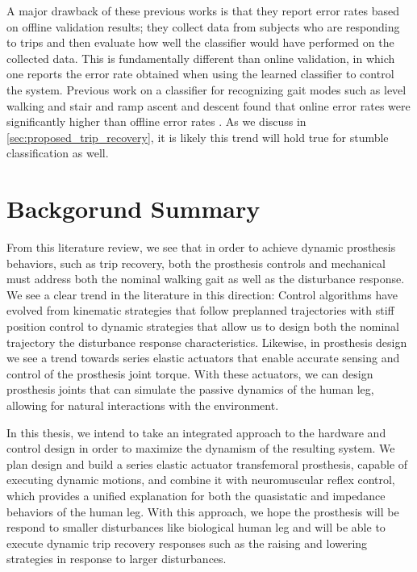 A major drawback of these previous works is that they report error rates based
on offline validation results; \ie they collect data from subjects who are
responding to trips and then evaluate how well the classifier would have
performed on the collected data. This is fundamentally different than online
validation, in which one reports the error rate obtained when using the
learned classifier to control the system. Previous work on a classifier for
recognizing gait modes such as level walking and stair and ramp ascent and
descent found that online error rates were significantly higher than offline
error rates \citep{hargrove2015intuitive}. As we discuss in
\cref{sec:proposed_trip_recovery}, it is likely this trend will hold true for
stumble classification as well.

\section{Backgorund Summary}
From this literature review, we see that in order to achieve dynamic prosthesis
behaviors, such as trip recovery, both the prosthesis controls and mechanical
must address both the nominal walking gait as well as the disturbance response.
We see a clear trend in the literature in this direction: Control algorithms
have evolved from kinematic strategies that follow preplanned trajectories with
stiff position control to dynamic strategies that allow us to design both the
nominal trajectory the disturbance response characteristics. Likewise, in
prosthesis design we see a trend towards series elastic actuators that enable
accurate sensing and control of the prosthesis joint torque. With these
actuators, we can design prosthesis joints that can simulate the passive
dynamics of the human leg, allowing for natural interactions with the
environment. 

In this thesis, we intend to take an integrated approach to the hardware and
control design in order to maximize the dynamism of the resulting system. We
plan design and build a series elastic actuator transfemoral prosthesis, capable
of executing dynamic motions, and combine it with neuromuscular reflex control,
which provides a unified explanation for both the quasistatic and impedance
behaviors of the human leg. With this approach, we hope the prosthesis will be
respond to smaller disturbances like biological human leg and will be able to
execute dynamic trip recovery responses such as the raising and lowering
strategies in response to larger disturbances.
